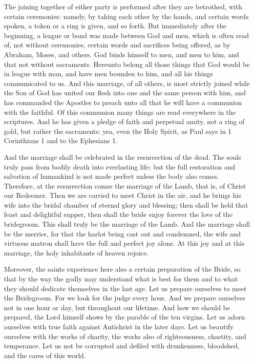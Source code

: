 The joining together of either party is performed after they are betrothed, with certain ceremonies: namely, by taking each other by the hands, and certain words spoken, a token or a ring is given, and so forth. But immediately after the beginning, a league or bond was made between God and men, which is often read of, not without ceremonies, certain words and sacrifices being offered, as by Abraham, Moses, and others. God binds himself to men, and men to him, and that not without sacraments. Hereunto belong all those things that God would be in league with man, and have men bounden to him, and all his things communicated to us. And this marriage, of all others, is most strictly joined while the Son of God has united our flesh into one and the same person with him, and has commanded the Apostles to preach unto all that he will have a communion with the faithful. Of this communion many things are read everywhere in the scriptures. And he has given a pledge of faith and perpetual amity, not a ring of gold, but rather the sacraments: yea, even the Holy Spirit, as Paul says in 1 Corinthians 1 and to the Ephesians 1.

And the marriage shall be celebrated in the resurrection of the dead. The souls truly pass from bodily death into everlasting life; but the full restoration and salvation of humankind is not made perfect unless the body also comes. Therefore, at the resurrection comes the marriage of the Lamb, that is, of Christ our Redeemer. Then we are carried to meet Christ in the air, and he brings his wife into the bridal chamber of eternal glory and blessing; then shall be held that feast and delightful supper, then shall the bride enjoy forever the love of the bridegroom. This shall truly be the marriage of the Lamb. And the marriage shall be the merrier, for that the harlot being cast out and condemned, the wife and virtuous matron shall have the full and perfect joy alone. At this joy and at this marriage, the holy inhabitants of heaven rejoice.

Moreover, the saints experience here also a certain preparation of the Bride, so that by the way the godly may understand what is best for them and to what they should dedicate themselves in the last age. Let us prepare ourselves to meet the Bridegroom. For we look for the judge every hour. And we prepare ourselves not in one hour or day, but throughout our lifetime. And how we should be prepared, the Lord himself shows by the parable of the ten virgins. Let us adorn ourselves with true faith against Antichrist in the later days. Let us beautify ourselves with the works of charity, the works also of righteousness, chastity, and temperance. Let us not be corrupted and defiled with drunkenness, bloodshed, and the cares of this world.

